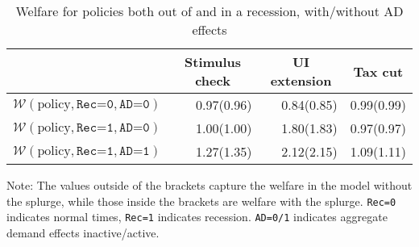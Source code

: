 \documentclass[\PathToRoot/\ProjectName]{subfiles}
\begin{document}
\begin{table}[tb] 
  \caption{Welfare for policies both out of and in a recession, with/without AD effects}
  \whenintegrated{\label{tab:welfare6-SplurgeComp}} 
  \centering

  \begin{tabular*}
    {\textwidth}{@{\extracolsep{\fill}}lrrr@{}} 
    \hline
    & \multicolumn{1}{c}{Stimulus check} & \multicolumn{1}{c}{UI extension} & \multicolumn{1}{c}{Tax cut} \\ \hline
    $\mathcal{W}(\text{policy}, \texttt{Rec=0}, \texttt{AD=0})$ & 0.97(0.96) & 0.84(0.85) & 0.99(0.99) \\
    \addlinespace
    $\mathcal{W}(\text{policy}, \texttt{Rec=1}, \texttt{AD=0})$ & 1.00(1.00) & 1.80(1.83) & 0.97(0.97) \\
    $\mathcal{W}(\text{policy}, \texttt{Rec=1}, \texttt{AD=1})$ & 1.27(1.35) & 2.12(2.15) & 1.09(1.11) \\
    \hline
  \end{tabular*}

  \noindent\parbox{\textwidth}{
    \medskip
    \footnotesize Note: The values outside of the brackets capture the welfare in the model without the splurge, while those inside the brackets are welfare with the splurge. \texttt{Rec=0} indicates normal times, \texttt{Rec=1} indicates recession. \texttt{AD=0/1} indicates aggregate demand effects inactive/active.
  }
\end{table}

\vspace{0.5em}
\end{document}
